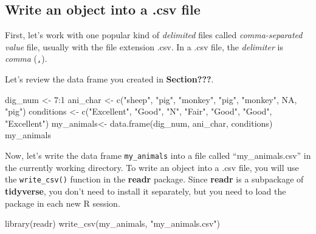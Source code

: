 \documentclass[
]{book}
\newenvironment{Shaded}{\begin{snugshade}}{\end{snugshade}}
\newcommand{\ConstantTok}[1]{\textcolor[rgb]{0.00,0.00,0.00}{#1}}
\newcommand{\DecValTok}[1]{\textcolor[rgb]{0.00,0.00,0.81}{#1}}
\newcommand{\FunctionTok}[1]{\textcolor[rgb]{0.00,0.00,0.00}{#1}}
\newcommand{\NormalTok}[1]{#1}
\newcommand{\OtherTok}[1]{\textcolor[rgb]{0.56,0.35,0.01}{#1}}
\newcommand{\SpecialCharTok}[1]{\textcolor[rgb]{0.00,0.00,0.00}{#1}}
\newcommand{\StringTok}[1]{\textcolor[rgb]{0.31,0.60,0.02}{#1}}
\begin{document}
\hypertarget{write-an-object-into-a-.csv-file}{%
\subsection{Write an object into a .csv file}\label{write-an-object-into-a-.csv-file}}

First, let's work with one popular kind of \emph{delimited} files called \emph{comma-separated value} file, usually with the file extension .csv. In a .csv file, the \emph{delimiter} is \emph{comma} (\texttt{,}).

Let's review the data frame you created in \textbf{Section???}.

\begin{Shaded}
\begin{Highlighting}[]
\NormalTok{dig\_num }\OtherTok{\textless{}{-}} \DecValTok{7}\SpecialCharTok{:}\DecValTok{1}
\NormalTok{ani\_char }\OtherTok{\textless{}{-}} \FunctionTok{c}\NormalTok{(}\StringTok{"sheep"}\NormalTok{, }\StringTok{"pig"}\NormalTok{, }\StringTok{"monkey"}\NormalTok{, }\StringTok{"pig"}\NormalTok{, }\StringTok{"monkey"}\NormalTok{, }\ConstantTok{NA}\NormalTok{, }\StringTok{"pig"}\NormalTok{)}
\NormalTok{conditions }\OtherTok{\textless{}{-}} \FunctionTok{c}\NormalTok{(}\StringTok{"Excellent"}\NormalTok{, }\StringTok{"Good"}\NormalTok{, }\StringTok{"N"}\NormalTok{, }\StringTok{"Fair"}\NormalTok{, }\StringTok{"Good"}\NormalTok{, }\StringTok{"Good"}\NormalTok{, }\StringTok{"Excellent"}\NormalTok{)}
\NormalTok{my\_animals}\OtherTok{\textless{}{-}} \FunctionTok{data.frame}\NormalTok{(dig\_num, ani\_char, conditions)}
\NormalTok{my\_animals}
\end{Highlighting}
\end{Shaded}

Now, let's write the data frame \texttt{my\_animals} into a file called ``my\_animals.csv'' in the currently working directory. To write an object into a .csv file, you will use the \texttt{write\_csv()} function in the \textbf{readr} package. Since \textbf{readr} is a subpackage of \textbf{tidyverse}, you don't need to install it separately, but you need to load the package in each new R session.

\begin{Shaded}
\begin{Highlighting}[]
\FunctionTok{library}\NormalTok{(readr)}
\FunctionTok{write\_csv}\NormalTok{(my\_animals, }\StringTok{"my\_animals.csv"}\NormalTok{)}
\end{Highlighting}
\end{Shaded}
\end{document}

